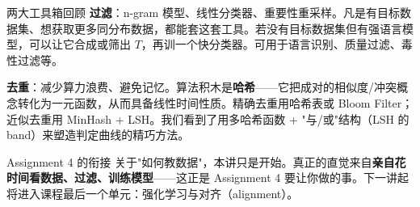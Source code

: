 \documentclass[a4paper]{article}
\begin{document}
\begin{importantbox}{两大工具箱回顾}
\textbf{过滤}：n-gram 模型、线性分类器、重要性重采样。凡是有目标数据集、想获取更多同分布数据，都能套这套工具。若没有目标数据集但有强语言模型，可以让它合成或筛出 $T$，再训一个快分类器。可用于语言识别、质量过滤、毒性过滤等。
\par\medskip
\textbf{去重}：减少算力浪费、避免记忆。算法积木是\textbf{哈希}——它把成对的相似度/冲突概念转化为一元函数，从而具备线性时间性质。精确去重用哈希表或 Bloom Filter；近似去重用 MinHash + LSH。我们看到了用多哈希函数 + "与/或"结构（LSH 的 band）来塑造判定曲线的精巧方法。
\end{importantbox}

\begin{practicebox}{ Assignment 4 的衔接}
关于"如何教数据"，本讲只是开始。真正的直觉来自\textbf{亲自花时间看数据、过滤、训练模型}——这正是 Assignment 4 要让你做的事。下一讲起将进入课程最后一个单元：强化学习与对齐（alignment）。
\end{practicebox}
\end{document}
